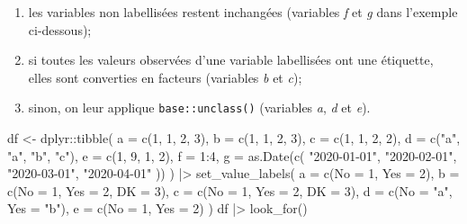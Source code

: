 \documentclass[
  letterpaper,
  DIV=11,
  numbers=noendperiod,
  oneside]{scrreprt}
\newenvironment{Shaded}{\begin{snugshade}}{\end{snugshade}}
\newcommand{\AttributeTok}[1]{\textcolor[rgb]{0.40,0.45,0.13}{#1}}
\newcommand{\DecValTok}[1]{\textcolor[rgb]{0.68,0.00,0.00}{#1}}
\newcommand{\FunctionTok}[1]{\textcolor[rgb]{0.28,0.35,0.67}{#1}}
\newcommand{\NormalTok}[1]{\textcolor[rgb]{0.00,0.23,0.31}{#1}}
\newcommand{\OtherTok}[1]{\textcolor[rgb]{0.00,0.23,0.31}{#1}}
\newcommand{\SpecialCharTok}[1]{\textcolor[rgb]{0.37,0.37,0.37}{#1}}
\newcommand{\StringTok}[1]{\textcolor[rgb]{0.13,0.47,0.30}{#1}}
\providecommand{\tightlist}{%
  \setlength{\itemsep}{0pt}\setlength{\parskip}{0pt}}\usepackage{longtable,booktabs,array}
\begin{document}
\begin{enumerate}
\def\labelenumi{\arabic{enumi}.}
\tightlist
\item
  les variables non labellisées restent inchangées (variables \emph{f}
  et \emph{g} dans l'exemple ci-dessous);
\item
  si toutes les valeurs observées d'une variable labellisées ont une
  étiquette, elles sont converties en facteurs (variables \emph{b} et
  \emph{c});
\item
  sinon, on leur applique \texttt{base::unclass()} (variables \emph{a},
  \emph{d} et \emph{e}).
\end{enumerate}

\begin{Shaded}
\begin{Highlighting}[]
\NormalTok{df }\OtherTok{\textless{}{-}}\NormalTok{ dplyr}\SpecialCharTok{::}\FunctionTok{tibble}\NormalTok{(}
  \AttributeTok{a =} \FunctionTok{c}\NormalTok{(}\DecValTok{1}\NormalTok{, }\DecValTok{1}\NormalTok{, }\DecValTok{2}\NormalTok{, }\DecValTok{3}\NormalTok{),}
  \AttributeTok{b =} \FunctionTok{c}\NormalTok{(}\DecValTok{1}\NormalTok{, }\DecValTok{1}\NormalTok{, }\DecValTok{2}\NormalTok{, }\DecValTok{3}\NormalTok{),}
  \AttributeTok{c =} \FunctionTok{c}\NormalTok{(}\DecValTok{1}\NormalTok{, }\DecValTok{1}\NormalTok{, }\DecValTok{2}\NormalTok{, }\DecValTok{2}\NormalTok{),}
  \AttributeTok{d =} \FunctionTok{c}\NormalTok{(}\StringTok{"a"}\NormalTok{, }\StringTok{"a"}\NormalTok{, }\StringTok{"b"}\NormalTok{, }\StringTok{"c"}\NormalTok{),}
  \AttributeTok{e =} \FunctionTok{c}\NormalTok{(}\DecValTok{1}\NormalTok{, }\DecValTok{9}\NormalTok{, }\DecValTok{1}\NormalTok{, }\DecValTok{2}\NormalTok{),}
  \AttributeTok{f =} \DecValTok{1}\SpecialCharTok{:}\DecValTok{4}\NormalTok{,}
  \AttributeTok{g =} \FunctionTok{as.Date}\NormalTok{(}\FunctionTok{c}\NormalTok{(}
    \StringTok{"2020{-}01{-}01"}\NormalTok{, }\StringTok{"2020{-}02{-}01"}\NormalTok{, }
    \StringTok{"2020{-}03{-}01"}\NormalTok{, }\StringTok{"2020{-}04{-}01"}
\NormalTok{  ))}
\NormalTok{) }\SpecialCharTok{|\textgreater{}} 
  \FunctionTok{set\_value\_labels}\NormalTok{(}
    \AttributeTok{a =} \FunctionTok{c}\NormalTok{(}\AttributeTok{No =} \DecValTok{1}\NormalTok{, }\AttributeTok{Yes =} \DecValTok{2}\NormalTok{),}
    \AttributeTok{b =} \FunctionTok{c}\NormalTok{(}\AttributeTok{No =} \DecValTok{1}\NormalTok{, }\AttributeTok{Yes =} \DecValTok{2}\NormalTok{, }\AttributeTok{DK =} \DecValTok{3}\NormalTok{),}
    \AttributeTok{c =} \FunctionTok{c}\NormalTok{(}\AttributeTok{No =} \DecValTok{1}\NormalTok{, }\AttributeTok{Yes =} \DecValTok{2}\NormalTok{, }\AttributeTok{DK =} \DecValTok{3}\NormalTok{),}
    \AttributeTok{d =} \FunctionTok{c}\NormalTok{(}\AttributeTok{No =} \StringTok{"a"}\NormalTok{, }\AttributeTok{Yes =} \StringTok{"b"}\NormalTok{),}
    \AttributeTok{e =} \FunctionTok{c}\NormalTok{(}\AttributeTok{No =} \DecValTok{1}\NormalTok{, }\AttributeTok{Yes =} \DecValTok{2}\NormalTok{)}
\NormalTok{  )}
\NormalTok{df }\SpecialCharTok{|\textgreater{}} \FunctionTok{look\_for}\NormalTok{()}
\end{Highlighting}
\end{Shaded}
\end{document}
